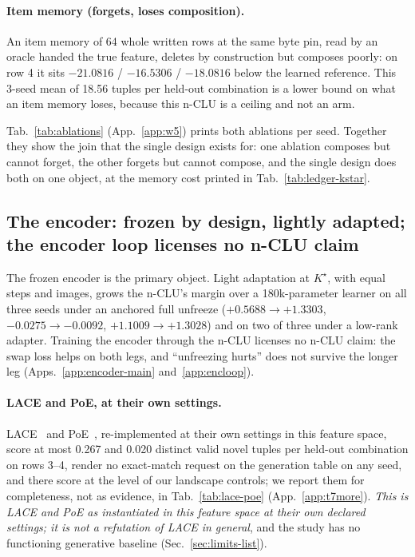 \documentclass{article} %
\newcommand{\Kstar}{\ensuremath{K^{\star}}}
\begin{document}
\paragraph{Item memory (forgets, loses composition).} An item memory of 64 whole written rows at
the same byte pin, read by an oracle handed the true feature, deletes by construction but
composes poorly: on row 4 it sits $-21.0816$ / $-16.5306$ / $-18.0816$ below the learned
reference. This 3-seed mean of 18.56 tuples per held-out combination is a lower bound on what an item memory
loses, because this n-CLU is a ceiling and not an arm. %

Tab.~\ref{tab:ablations} (App.~\ref{app:w5}) prints both ablations per seed. Together they
show the join that the single design exists for: one ablation composes but cannot forget, the
other forgets but cannot compose, and the single design does both on one object, at the memory
cost printed in Tab.~\ref{tab:ledger-kstar}.

\subsection{The encoder: frozen by design, lightly adapted; the encoder loop licenses no n-CLU claim}
\label{sec:adapt}\label{sec:bard}
The frozen encoder is the primary object. Light adaptation at $\Kstar$, with equal steps and
images, grows the n-CLU's margin over a 180k-parameter learner on all three seeds under an
anchored full unfreeze ($+0.5688\to+1.3303$, $-0.0275\to-0.0092$, $+1.1009\to+1.3028$) and on two
of three under a low-rank adapter. %
Training the encoder through the n-CLU licenses no n-CLU claim: the swap loss helps on both legs,
and ``unfreezing hurts'' does not survive the longer leg (Apps.~\ref{app:encoder-main}
and~\ref{app:encloop}).

\paragraph{LACE and PoE, at their own settings.}
LACE~\citep{nie2021controllable} and PoE~\citep{hinton2002training}, re-implemented at their own
settings in this feature space, score at most 0.267 and 0.020 distinct valid novel tuples per held-out combination %
on rows 3--4, render no exact-match request on the generation table on any seed, and there score at
the level of our landscape controls; we report them for completeness, not as evidence, in
Tab.~\ref{tab:lace-poe} (App.~\ref{app:t7more}). \emph{This is LACE and PoE as instantiated in
this feature space at their own declared settings; it is not a refutation of LACE in general}, and
the study has no functioning generative baseline (Sec.~\ref{sec:limits-list}).
\end{document}
